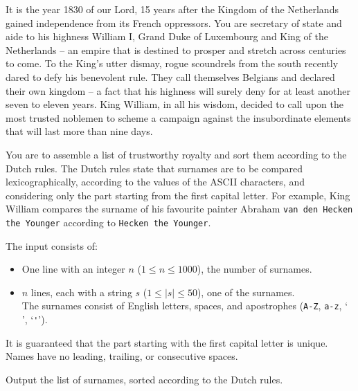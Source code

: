 

\newcommand{\maxn}{1000}
\newcommand{\maxs}{50}

It is the year 1830 of our Lord, 15 years after the Kingdom of the Netherlands gained independence from its French oppressors.
You are secretary of state and aide to his highness William I, Grand Duke of Luxembourg and King of the Netherlands --
an empire that is destined to prosper and stretch across centuries to come.
To the King's utter dismay, rogue scoundrels from the south recently dared to defy his benevolent rule.
They call themselves Belgians and declared their own kingdom --
a fact that his highness will surely deny for at least another seven to eleven years.
King William, in all his wisdom, decided to call upon the most trusted noblemen to scheme a campaign against the insubordinate elements that will last more than nine days.

You are to assemble a list of trustworthy royalty and sort them according to the Dutch rules.
The Dutch rules state that surnames are to be compared lexicographically, according to the values of the ASCII characters, and considering only the part starting from the first capital letter.
For example, King William compares the surname of his favourite painter Abraham \texttt{van den Hecken the Younger} according to \texttt{Hecken the Younger}.


\begin{Input}
    The input consists of:
    \begin{itemize}
        \item One line with an integer $n$ ($1\leq n\leq \maxn$), the number of surnames.
        \item $n$ lines, each with a string $s$ ($1\leq |s|\leq\maxs$), one of the surnames. \\
            The surnames consist of English letters, spaces, and apostrophes
            (\texttt{A-Z}, \texttt{a-z}, `\texttt{ }', `\verb|'|').
    \end{itemize}
    It is guaranteed that the part starting with the first capital letter is unique.
    Names have no leading, trailing, or consecutive spaces.
\end{Input}

\begin{Output}
    Output the list of surnames, sorted according to the Dutch rules.
\end{Output}
